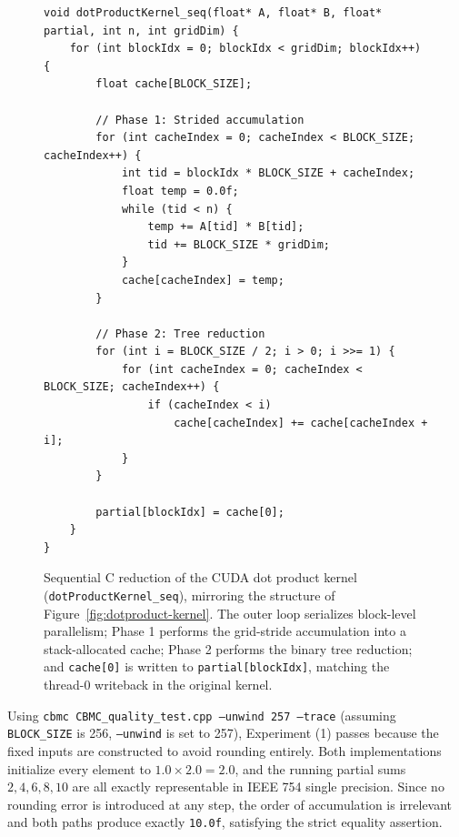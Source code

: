 \documentclass{article}
\begin{document}
\begin{figure}[h]
\begin{verbatim}
void dotProductKernel_seq(float* A, float* B, float* partial, int n, int gridDim) {
    for (int blockIdx = 0; blockIdx < gridDim; blockIdx++) {
        float cache[BLOCK_SIZE];

        // Phase 1: Strided accumulation
        for (int cacheIndex = 0; cacheIndex < BLOCK_SIZE; cacheIndex++) {
            int tid = blockIdx * BLOCK_SIZE + cacheIndex;
            float temp = 0.0f;
            while (tid < n) {
                temp += A[tid] * B[tid];
                tid += BLOCK_SIZE * gridDim;
            }
            cache[cacheIndex] = temp;
        }

        // Phase 2: Tree reduction
        for (int i = BLOCK_SIZE / 2; i > 0; i >>= 1) {
            for (int cacheIndex = 0; cacheIndex < BLOCK_SIZE; cacheIndex++) {
                if (cacheIndex < i)
                    cache[cacheIndex] += cache[cacheIndex + i];
            }
        }

        partial[blockIdx] = cache[0];
    }
}
\end{verbatim}
\caption{Sequential C reduction of the CUDA dot product kernel (\texttt{dotProductKernel\_seq}), mirroring the structure of Figure~\ref{fig:dotproduct-kernel}. The outer loop serializes block-level parallelism; Phase 1 performs the grid-stride accumulation into a stack-allocated cache; Phase 2 performs the binary tree reduction; and \texttt{cache[0]} is written to \texttt{partial[blockIdx]}, matching the thread-0 writeback in the original kernel.}
\label{fig:dotprod-kernel-seq}
\end{figure}

Using \texttt{cbmc CBMC\_quality\_test.cpp --unwind 257 --trace} (assuming \texttt{BLOCK\_SIZE} is 256, \texttt{--unwind} is set to 257), Experiment (1) passes because the fixed inputs are constructed to avoid rounding entirely. Both implementations initialize every element to $1.0 \times 2.0 = 2.0$, and the running partial sums $2, 4, 6, 8, 10$ are all exactly representable in IEEE 754 single precision. Since no rounding error is introduced at any step, the order of accumulation is irrelevant and both paths produce exactly \texttt{10.0f}, satisfying the strict equality assertion.
\end{document}
